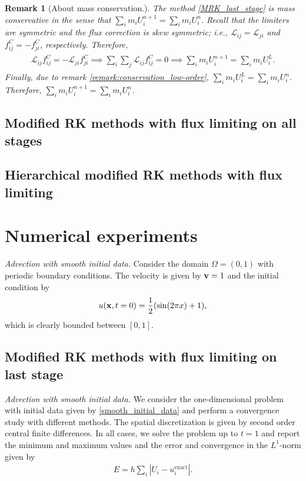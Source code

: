 \documentclass{article}
\newtheorem{remark}{Remark}
\numberwithin{remark}{subsection}
\newcommand{\bfv}{{\bf v}}
\newcommand{\bfx}{{\bf x}}
\begin{document}
\begin{remark}[About mass conservation.]
  The method \eqref{MRK_last_stage} is mass conservative in the sense that
  $\sum_i m_iU_i^{n+1}=\sum_i m_iU_i^n$.
  Recall that the limiters are symmetric and the flux correction is skew symmetric; i.e.,
  $\mathcal{L}_{ij}=\mathcal{L}_{ji}$ and $f_{ij}^C=-f_{ji}^C$, respectively.
  Therefore,
  \begin{align*}
    \begin{split}
    \mathcal{L}_{ij}f_{ij}^C=-\mathcal{L}_{ji}f_{ji}^C
    \implies \sum_i\sum_j \mathcal{L}_{ij}f_{ij}^C=0 
    \implies \sum_i m_iU_i^{n+1}=\sum_i m_iU_i^L.
    \end{split}
  \end{align*}
  Finally, due to remark \ref{remark:conservation_low-order}, $\sum_i m_iU_i^L=\sum_i m_iU_i^n$.
  Therefore, $\sum_i m_iU_i^{n+1}=\sum_i m_iU_i^n$.  
\end{remark}

\subsection{Modified RK methods with flux limiting on all stages}
\subsection{Hierarchical modified RK methods with flux limiting}

\clearpage
\section{Numerical experiments}

{\it Advection with smooth initial data.} Consider the domain $\Omega=(0,1)$
with periodic boundary conditions. The velocity is given by $\bfv=1$ and the initial
condition by
\begin{align}\label{smooth_initial_data}
  u(\bfx,t=0)=\frac{1}{2}(\sin(2\pi x)+1), 
\end{align}
which is clearly bounded between $[0,1]$.

\subsection{Modified RK methods with flux limiting on last stage}

{\it Advection with smooth initial data.}
We consider the one-dimensional problem with initial data given by \eqref{smooth_initial_data}
and perform a convergence study with different methods.
The spatial discretization is given by second order central finite differences.
%
In all cases, we solve the problem up to $t=1$ and report the minimum and maximum values
and the error and convergence in the $L^1$-norm given by
\begin{align}
  E=h\sum_i |U_i-u_i^{\text{exact}}|.
\end{align}
\end{document}

